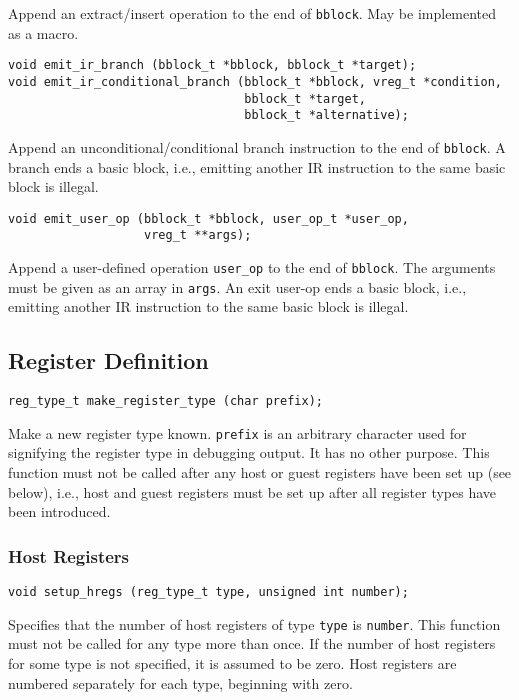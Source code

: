 \documentclass{article}
\newcommand{\cc}[1]{\texttt{#1}} %
\begin{document}
Append an extract/insert operation to the end of \cc{bblock}.  May be
implemented as a macro.

\begin{verbatim}
void emit_ir_branch (bblock_t *bblock, bblock_t *target);
void emit_ir_conditional_branch (bblock_t *bblock, vreg_t *condition,
                                 bblock_t *target,
                                 bblock_t *alternative);
\end{verbatim}

Append an unconditional/conditional branch instruction to the end of
\cc{bblock}.  A branch ends a basic block, i.e., emitting another IR
instruction to the same basic block is illegal.

\begin{verbatim}
void emit_user_op (bblock_t *bblock, user_op_t *user_op,
                   vreg_t **args);
\end{verbatim}

Append a user-defined operation \cc{user\_op} to the end of
\cc{bblock}.  The arguments must be given as an array in \cc{args}.
An exit user-op ends a basic block, i.e., emitting another IR
instruction to the same basic block is illegal.

\subsection{Register Definition}
\label{sec:regdef}

\begin{verbatim}
reg_type_t make_register_type (char prefix);
\end{verbatim}

Make a new register type known.  \cc{prefix} is an arbitrary character
used for signifying the register type in debugging output.  It has no
other purpose.  This function must not be called after any host or
guest registers have been set up (see below), i.e., host and guest
registers must be set up after all register types have been
introduced.

\subsubsection{Host Registers}

\begin{verbatim}
void setup_hregs (reg_type_t type, unsigned int number);
\end{verbatim}

Specifies that the number of host registers of type \cc{type} is
\cc{number}.  This function must not be called for any type more than
once.  If the number of host registers for some type is not specified,
it is assumed to be zero.  Host registers are numbered separately for
each type, beginning with zero.
\end{document}
